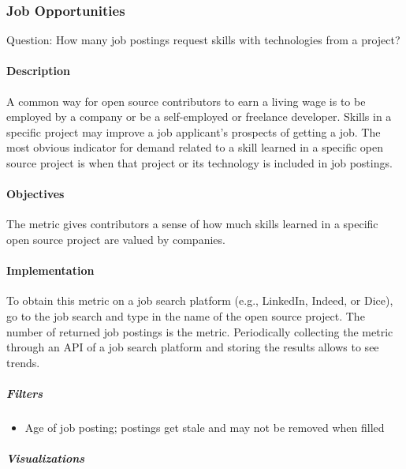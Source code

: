 \hypertarget{job-opportunities}{%
\subsubsection{Job Opportunities}\label{job-opportunities}}

Question: How many job postings request skills with technologies from a
project?

\hypertarget{description}{%
\paragraph{Description}\label{description}}

A common way for open source contributors to earn a living wage is to be
employed by a company or be a self-employed or freelance developer.
Skills in a specific project may improve a job applicant's prospects of
getting a job. The most obvious indicator for demand related to a skill
learned in a specific open source project is when that project or its
technology is included in job postings.

\hypertarget{objectives}{%
\paragraph{Objectives}\label{objectives}}

The metric gives contributors a sense of how much skills learned in a
specific open source project are valued by companies.

\hypertarget{implementation}{%
\paragraph{Implementation}\label{implementation}}

To obtain this metric on a job search platform (e.g., LinkedIn, Indeed,
or Dice), go to the job search and type in the name of the open source
project. The number of returned job postings is the metric. Periodically
collecting the metric through an API of a job search platform and
storing the results allows to see trends.

\hypertarget{filters}{%
\subparagraph{Filters}\label{filters}}

\begin{itemize}
\tightlist
\item
  Age of job posting; postings get stale and may not be removed when
  filled
\end{itemize}

\hypertarget{visualizations}{%
\subparagraph{Visualizations}\label{visualizations}}

